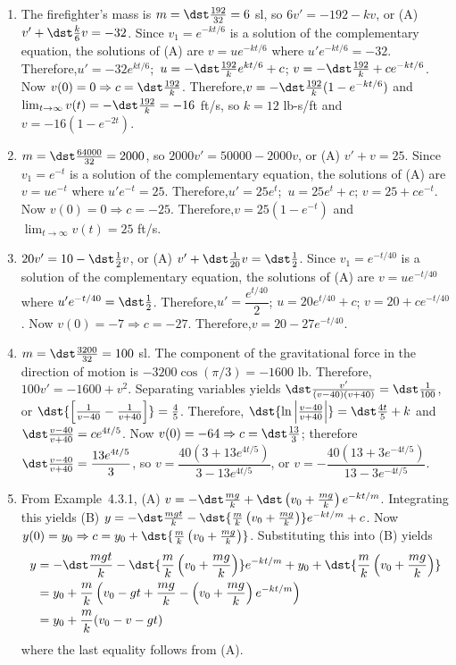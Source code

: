 \documentclass[openany]{book}
\newenvironment{sectionSolutions}{
 \begin{enumerate}[item-label={\thesection.\arabic{enumi}.}]
}{
 \end{enumerate}
}
\begin{document}
\begin{sectionSolutions}
\item
The firefighter's mass is $m=\dst\frac{192}{32}=6$ sl, so
 $6v'=-192-kv$, or (A) $v'+\dst\frac{k}{6}v=-32$.
Since $v_1=e^{-kt/6}$ is a solution of the complementary equation,
the solutions of (A) are $v=ue^{-kt/6}$ where $u'e^{-kt/6}=-32$.
Therefore,$u'=-32e^{kt/6}$;\ $u=-\dst\frac{192}{ k}e^{kt/6}+c$;\;
$v=-\dst\frac{192}{ k}+ce^{-kt/6}$. Now $v(0)=0\Rightarrow
c=\dst\frac{192}{ k}$. Therefore,$v=-\dst\frac{192}{ k}(1-e^{-kt/6})$
and $\lim_{t\to\infty}v(t)=-\dst\frac{192}{ k}=-16$ ft/s, so $k=12$
lb-s/ft and $v=-16(1-e^{-2t})$.

\addtocounter{enumi}{-1}
\item%
 $m=\dst\frac{64000}{32}=2000$, so
 $2000v'=50000-2000v$, or (A)
$v'+v=25$.
Since $v_1=e^{-t}$ is a solution of the complementary equation,
the solutions of (A) are $v=ue^{-t}$ where $u'e^{-t}=25$.
Therefore,$u'=25e^t$;\ $u=25e^t+c$;\;
$v=25+ce^{-t}$. Now $v(0)=0\Rightarrow
c=-25$. Therefore,$v=25(1-e^{-t})$
and $\lim_{t\to\infty}v(t)=25$ ft/s.

\addtocounter{enumi}{-1}
\item%
 $20v'=10-\dst\frac{1}{2}v$, or (A)
$v'+\dst\frac{1}{20}v=\dst\frac{1}{2}$.
Since $v_1=e^{-t/40}$ is a solution of the complementary equation,
the solutions of (A) are $v=ue^{-t/40}$ where
$u'e^{-t/40}=\dst\frac{1}{2}$. Therefore,$u'=\dfrac{e^{t/40}}{2}$;\;
$u=20e^{t/40}+c$;\;
$v=20+ce^{-t/40}$. Now $v(0)=-7\Rightarrow
c=-27$. Therefore,$v=20-27e^{-t/40}$.



\item
 $m=\dst\frac{3200}{32}=100$ sl. The
component of the gravitational force in the direction of motion is
$-3200\cos(\pi/3)=-1600$ lb. Therefore,
$100v'=-1600+v^2$. Separating variables yields
$\dst\frac{v'}{(v-40)(v+40)}=\dst\frac{1}{100}$, or $\dst{\left[\frac{1}{
v-40}-\frac{1}{ v+40}\right]}=\frac{4}{5}$. Therefore,
$\dst{\ln\left|\frac{v-40}{
v+40}\right|}=\dst\frac{4t}{5}+k$ and $\dst\frac{v-40}{ v+40}=ce^{4t/5}$.
Now $v(0)=-64\Rightarrow c=\dst\frac{13}{3}$; therefore $\dst\frac{v-40}{
v+40}=\dfrac{13e^{4t/5}}{3}$, so
$v=\dfrac{40(3+13e^{4t/5})}{3-13e^{4t/5}}$, or
$v=-\dfrac{40(13+3e^{-4t/5})}{13-3e^{-4t/5}}$.



\item
From Example~4.3.1, (A) $v=-\dst\frac{mg}{
k}+\dst\left(v_0+\frac{mg}{ k}\right)e^{-kt/m}$. Integrating this yields
(B) $y=-\dst\frac{mgt}{
k}-\dst{\frac{m}{ k}\left(v_0+\frac{mg}{ k}\right)}e^{-kt/m}+c$.
Now $y(0)=y_0\Rightarrow c=y_0+\dst{\frac{m}{ k}\left(v_0+\frac{mg}{
k}\right)}$. Substituting this into (B) yields
\begin{align*}
y&=-\dst\frac{mgt}{
k}-\dst{\frac{m}{ k}\left(v_0+\frac{mg}{ k}\right)}e^{-kt/m}+
y_0+\dst{\frac{m}{ k}\left(v_0+\frac{mg}{ k}\right)}\\
&=y_0+\frac{m}{ k}\left(v_0-gt+\frac{mg}{
k}-\left(v_0+\frac{mg}{ k}\right)e^{-kt/m}\right)\\
&=y_0+\frac{m}{ k}(v_0-v-gt)
\end{align*}
where the last equality follows from (A).



\end{sectionSolutions}
\end{document}
